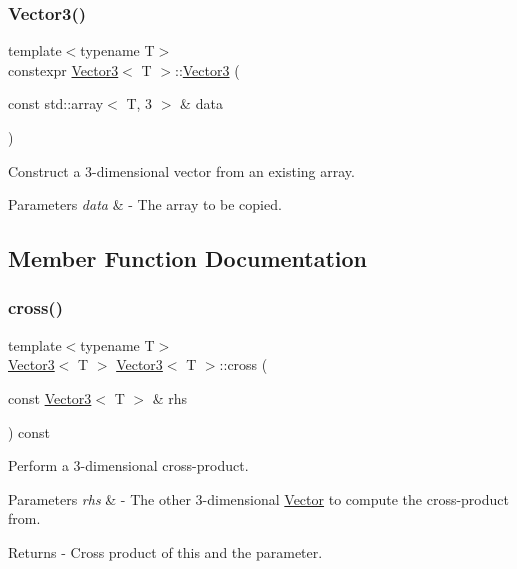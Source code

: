 \subsubsection{\texorpdfstring{Vector3()}{Vector3()}\hspace{0.1cm}{\footnotesize\ttfamily [4/4]}}
{\footnotesize\ttfamily template$<$typename T$>$ \\
constexpr \mbox{\hyperlink{class_vector3}{Vector3}}$<$ T $>$\+::\mbox{\hyperlink{class_vector3}{Vector3}} (\begin{DoxyParamCaption}\item[{const std\+::array$<$ T, 3 $>$ \&}]{data }\end{DoxyParamCaption})}

Construct a 3-\/dimensional vector from an existing array. 
\begin{DoxyParams}{Parameters}
{\em data} & -\/ The array to be copied. \\
\hline
\end{DoxyParams}


\subsection{Member Function Documentation}
\mbox{\label{class_vector3_a55d165924a9c4c4fb29aba342259450f}} 
\subsubsection{\texorpdfstring{cross()}{cross()}}
{\footnotesize\ttfamily template$<$typename T$>$ \\
\mbox{\hyperlink{class_vector3}{Vector3}}$<$ T $>$ \mbox{\hyperlink{class_vector3}{Vector3}}$<$ T $>$\+::cross (\begin{DoxyParamCaption}\item[{const \mbox{\hyperlink{class_vector3}{Vector3}}$<$ T $>$ \&}]{rhs }\end{DoxyParamCaption}) const}

Perform a 3-\/dimensional cross-\/product. 
\begin{DoxyParams}{Parameters}
{\em rhs} & -\/ The other 3-\/dimensional \mbox{\hyperlink{class_vector}{Vector}} to compute the cross-\/product from. \\
\hline
\end{DoxyParams}
\begin{DoxyReturn}{Returns}
-\/ Cross product of this and the parameter. 
\end{DoxyReturn}
\mbox{\label{class_vector3_abf12b7769b13982490e594877236abe1}} 
